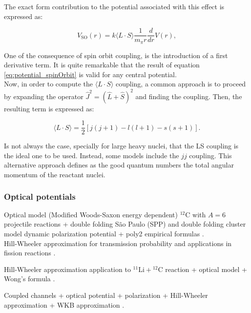 \documentclass[openany]{book}
\begin{document}
The exact form contribution to the potential associated with this effect is expressed as:

\begin{equation}  \label{eq:potential_spinOrbit}
	V_{\mathrm{SO}}(r) = k\langle L \cdot S \rangle  \frac{1}{m_{\pi}r} \frac{d}{dr} V(r),
\end{equation}

One of the consequence of spin orbit coupling, is the introduction of a first derivative term. It is quite remarkable that the result of equation \ref{eq:potential_spinOrbit} is valid for any central potential.  \\

Now, in order to compute the   $  \langle L \cdot S \rangle$ coupling, a common approach is to proceed by expanding the operator  $\hat J^2 = (\hat L + \hat S)^2$ and finding the coupling. Then, the resulting term is expressed as: 

\begin{equation}  \label{eq:potential_spinOrbit_LSexpansion}
	\langle L \cdot S \rangle =  \frac{1}{2}[j(j+1) - l(l+1) - s(s+1)].
\end{equation}

Is not always the case, specially for large heavy nuclei, that the LS coupling is the ideal one to be used. Instead, some models include the $jj$ coupling. This alternative approach defines as the good quantum numbers the total angular momentum of the reactant nuclei.

\subsubsection{Optical potentials} \label{sub:potential_effective_optical}

Optical model (Modified Woods-Saxon energy dependent) $\mathrm{{}^{12}C}$ with $A = 6$ projectile reactions + double folding São Paulo (SPP)  and double folding cluster model dynamic polarization potential + poly2 empirical formulas \cite{amer_penionzhkevich_2021}. \\

Hill-Wheeler approximation for transmission probability and applications in fission reactions \cite{hill_wheeler_1953}.

Hill-Wheeler approximation  application to $\mathrm{{}^{11}Li + {}^{12}C}$ reaction + optical model + Wong's formula  \cite{esbensen_2012}.
 
Coupled channels + optical potential +  polarization +  Hill-Wheeler approximation  +  WKB approximation \cite{cardenas_canto_donangelo_hussein_lubian_romanelli_2002}.
\end{document}

